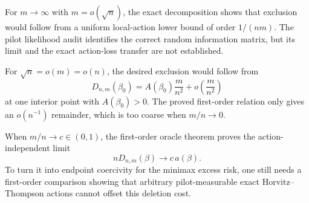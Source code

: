 For \(m\to\infty\) with \(m=o(\sqrt n)\), the exact decomposition shows that exclusion would follow from a uniform local-action lower bound of order \(1/(nm)\).  The pilot likelihood audit identifies the correct random information matrix, but its limit and the exact action-loss transfer are not established.

For \(\sqrt n=o(m)=o(n)\), the desired exclusion would follow from
\[
D_{n,m}(\beta_0)
=A(\beta_0)\frac m{n^2}
+o\!\left(\frac m{n^2}\right)
\]
at one interior point with \(A(\beta_0)>0\).  The proved first-order relation only gives an \(o(n^{-1})\) remainder, which is too coarse when \(m/n\to0\).

When \(m/n\to c\in(0,1)\), the first-order oracle theorem proves the action-independent limit
\[
nD_{n,m}(\beta)\longrightarrow c\,a(\beta).
\]
To turn it into endpoint coercivity for the minimax excess risk, one still needs a first-order comparison showing that arbitrary pilot-measurable exact Horvitz--Thompson actions cannot offset this deletion cost.
